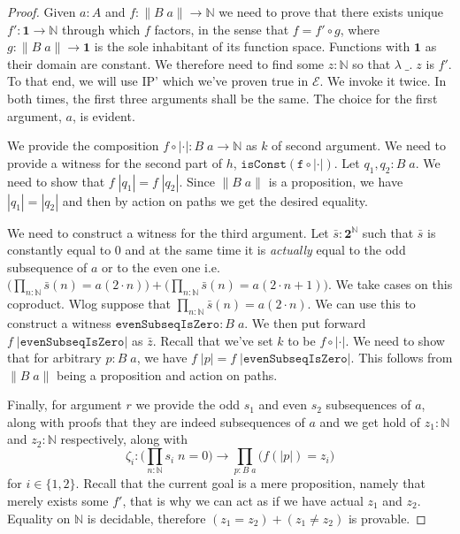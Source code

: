 \documentclass[12pt]{report}
\begin{document}
\begin{proof}
Given $a : A$ and $f : \lVert B\; a \rVert \rightarrow \mathbb{N}$ we need to prove that there exists unique $f' : \mathbf{1} \rightarrow \mathbb{N}$ through which $f$ factors, in the sense that $f = f' \circ g$, where $g : \lVert B\; a \rVert \rightarrow \mathbf{1}$ is the sole inhabitant of its function space. 
Functions with $\mathbf{1}$ as their domain are constant. 
We therefore need to find some $z : \mathbb{N}$ so that $\lambda\; \_.\; z$ is $f'$. 
To that end, we will use IP' which we've proven true in $\mathcal{E}$. 
We invoke it twice. 
In both times, the first three arguments shall be the same. 
The choice for the first argument, $a$, is evident. 

We provide the composition $f \circ |\cdot| : B\; a \rightarrow \mathbb{N}$ as $k$ of second argument. 
We need to provide a witness for the second part of $h$, $\mathtt{isConst(f \circ |\cdot|)}$. 
Let $q_1,q_2 : B\;a$. 
We need to show that $f\;|q_1| = f\; |q_2|$. 
Since $\lVert B\; a\rVert$ is a proposition, we have $|q_1| = |q_2|$ and then by action on paths we get the desired equality.

We need to construct a witness for the third argument. 
Let $\bar{s} : \mathbf{2}^\mathbb{N}$ such that $\bar{s}$ is constantly equal to $0$ and at the same time it is \textit{actually} equal to the odd subsequence of $a$ or to the even one i.e. $\big(\prod_{n : \mathbb{N}} \bar{s}(n) = a(2 \cdot n)\big) + \big(\prod_{n : \mathbb{N}} \bar{s}(n) = a(2\cdot n +1)\big)$. 
We take cases on this coproduct. 
Wlog suppose that $\prod_{n : \mathbb{N}} \bar{s}(n) = a(2 \cdot n)$. 
We can use this to construct a witness $\mathtt{evenSubseqIsZero} : B\;a$. 
We then put forward $f\;|\mathtt{evenSubseqIsZero}|$ as $\bar{z}$. 
Recall that we've set $k$ to be $f\circ |\cdot|$.
We need to show that for arbitrary $p : B\;a $, we have $f\; |p| = f\;|\mathtt{evenSubseqIsZero}|$. 
This follows from $\lVert B\;a\rVert$ being a proposition and action on paths. 

Finally, for argument $r$ we provide the odd $s_1$ and even $s_2$ subsequences of $a$, along with proofs that they are indeed subsequences of $a$ and we get hold of $z_1 : \mathbb{N}$ and $z_2 : \mathbb{N} $ respectively, along with 
$$\zeta_i : \big(\prod_{n : \mathbb{N}}s_i\; n = 0 \big)\rightarrow \prod_{p : B\; a}\big(f(|p|)=z_i\big)$$
for $i \in \{1,2\}$. 
Recall that the current goal is a mere proposition, namely that merely exists some $f'$, that is why we can act as if we have actual $z_1$ and $z_2$. 
Equality on $\mathbb{N}$ is decidable, therefore $(z_1 = z_2) + (z_1 \neq z_2)$ is provable. 


\end{proof}
\end{document}
